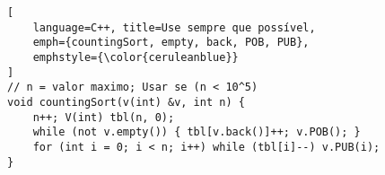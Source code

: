 \begin{lstlisting}[
    language=C++, title=Use sempre que possível,
    emph={countingSort, empty, back, POB, PUB},
    emphstyle={\color{ceruleanblue}}
]
// n = valor maximo; Usar se (n < 10^5)
void countingSort(v(int) &v, int n) {
    n++; V(int) tbl(n, 0);
    while (not v.empty()) { tbl[v.back()]++; v.POB(); }
	for (int i = 0; i < n; i++) while (tbl[i]--) v.PUB(i);
}
\end{lstlisting}
